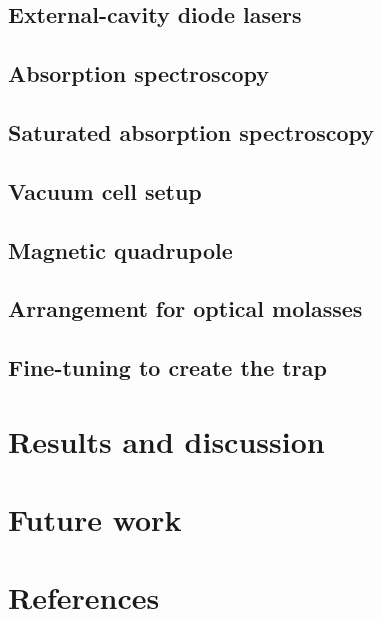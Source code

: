 \documentclass[11pt,twoside,a4paper]{article}
\begin{document}
\subsection{External-cavity diode lasers}
\subsection{Absorption spectroscopy}
\subsection{Saturated absorption spectroscopy}
\subsection{Vacuum cell setup}
\subsection{Magnetic quadrupole}
\subsection{Arrangement for optical molasses}
\subsection{Fine-tuning to create the trap}
\section{Results and discussion}
\section{Future work}
\vfill
\pagebreak
\section{References}


\end{document}
